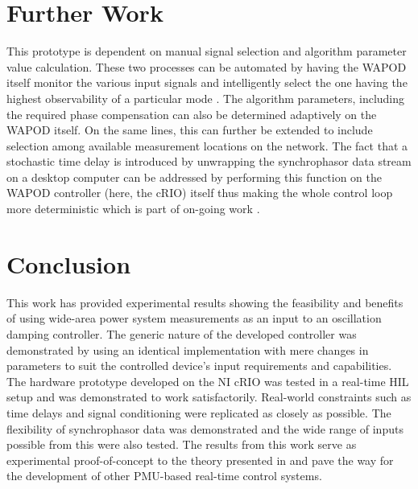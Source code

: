 \documentclass{ieeeaccess}
\begin{document}
\section{Further Work}\label{Future}

This prototype is dependent on manual signal selection and algorithm parameter value calculation. These two processes can be automated by having the WAPOD itself monitor the various input signals and intelligently select the one having the highest observability of a particular mode \cite{Yuwa}. The algorithm parameters, including the required phase compensation can also be determined adaptively on the WAPOD itself. On the same lines, this can further be extended to include selection among available measurement locations on the network. The fact that a stochastic time delay is introduced by unwrapping the synchrophasor data stream on a desktop computer can be addressed by performing this function on the WAPOD controller (here, the cRIO) itself thus making the whole control loop more deterministic which is part of on-going work \cite{Audur}. 

\section{Conclusion}\label{Conclusion}
This work has provided experimental results showing the feasibility and benefits of using wide-area power system measurements as an input to an oscillation damping controller. The generic nature of the developed controller was demonstrated by using an identical implementation with mere changes in parameters to suit the controlled device's input requirements and capabilities. The hardware prototype developed on the NI cRIO was tested in a real-time HIL setup and was demonstrated to work satisfactorily. Real-world constraints such as time delays and signal conditioning were replicated as closely as possible. The flexibility of synchrophasor data was demonstrated and the wide range of inputs possible from this were also tested. The results from this work serve as experimental proof-of-concept to the theory presented in \cite{Yuwa} and pave the way for the development of other PMU-based real-time control systems.
\end{document}
